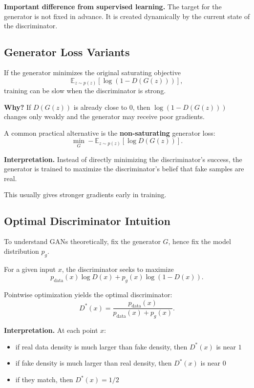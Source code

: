 \medskip

\noindent
\textbf{Important difference from supervised learning.}
The target for the generator is not fixed in advance. It is created dynamically by the current state of the discriminator.

\subsection{Generator Loss Variants}

If the generator minimizes the original saturating objective
\[
\mathbb{E}_{z\sim p(z)}[\log(1-D(G(z)))],
\]
training can be slow when the discriminator is strong.

\medskip

\noindent
\textbf{Why?}
If $D(G(z))$ is already close to $0$, then $\log(1-D(G(z)))$ changes only weakly and the generator may receive poor gradients.

\medskip

\noindent
A common practical alternative is the \textbf{non-saturating} generator loss:
\[
\min_G -\mathbb{E}_{z\sim p(z)}[\log D(G(z))].
\]

\medskip

\noindent
\textbf{Interpretation.}
Instead of directly minimizing the discriminator's success, the generator is trained to maximize the discriminator's belief that fake samples are real.

\medskip

\noindent
This usually gives stronger gradients early in training.

\subsection{Optimal Discriminator Intuition}

To understand GANs theoretically, fix the generator $G$, hence fix the model distribution $p_g$.

\medskip

\noindent
For a given input $x$, the discriminator seeks to maximize
\[
p_{\text{data}}(x)\log D(x) + p_g(x)\log(1-D(x)).
\]

Pointwise optimization yields the optimal discriminator:
\[
D^*(x)=\frac{p_{\text{data}}(x)}{p_{\text{data}}(x)+p_g(x)}.
\]

\medskip

\noindent
\textbf{Interpretation.}
At each point $x$:
\begin{itemize}
    \item if real data density is much larger than fake density, then $D^*(x)$ is near $1$
    \item if fake density is much larger than real density, then $D^*(x)$ is near $0$
    \item if they match, then $D^*(x)=1/2$
\end{itemize}

